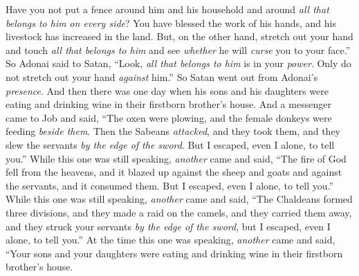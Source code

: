 \begin{biblechapter}
\verse Have you not put a fence around him and his household and around \textit{all that belongs to him} \textit{on every side}? You have blessed the work of his hands, and his livestock has increased in the land.
\verse But, on the other hand, stretch out your hand and touch \textit{all that belongs to him} and see \textit{whether} he will \textit{curse} you to your face.”
\verse So Adonai said to Satan, “Look, \textit{all that belongs to him} is in your \textit{power}. Only do not stretch out your hand \textit{against} him.” So Satan went out from Adonai’s \textit{presence}.
 And then there was one day when his sons and his daughters were eating and drinking wine in their firstborn brother’s house.
\verse And a messenger came to Job and said, “The oxen were plowing, and the female donkeys were feeding \textit{beside them}.
\verse Then the Sabeans \textit{attacked}, and they took them, and they slew the servants \textit{by the edge of the sword}. But I escaped, even I alone, to tell you.”
\verse While this one was still speaking, \textit{another} came and said, “The fire of God fell from the heavens, and it blazed up against the sheep and goats and against the servants, and it consumed them. But I escaped, even I alone, to tell you.”
\verse While this one was still speaking, \textit{another} came and said, “The Chaldeans formed three divisions, and they made a raid on the camels, and they carried them away, and they struck your servants \textit{by the edge of the sword}, but I escaped, even I alone, to tell you.”
\verse At the time this one was speaking, \textit{another} came and said, “Your sons and your daughters were eating and drinking wine in their firstborn brother’s house.

\end{biblechapter}
